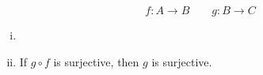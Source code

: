 %

\begin{frame}{}
  \begin{theorem}[]
    \[
      f: A \to B \qquad g: B \to C
    \]

    \begin{enumerate}[(i)]
      \item {}
      \item If $g \circ f$ is surjective, then $g$ is surjective.
    \end{enumerate}
  \end{theorem}
\end{frame}

%
%


